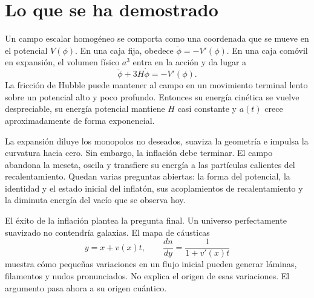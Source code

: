 \section{Lo que se ha demostrado}

Un campo escalar homogéneo se comporta como una coordenada que se mueve en el potencial \(V(\phi)\). En una caja fija, obedece \(\ddot\phi=-V'(\phi)\). En una caja comóvil en expansión, el volumen físico \(a^3\) entra en la acción y da lugar a
\[
\ddot\phi+3H\dot\phi=-V'(\phi).
\]
La fricción de Hubble puede mantener al campo en un movimiento terminal lento sobre un potencial alto y poco profundo. Entonces su energía cinética se vuelve despreciable, su energía potencial mantiene \(H\) casi constante y \(a(t)\) crece aproximadamente de forma exponencial.

La expansión diluye los monopolos no deseados, suaviza la geometría e impulsa la curvatura hacia cero. Sin embargo, la inflación debe terminar. El campo abandona la meseta, oscila y transfiere su energía a las partículas calientes del recalentamiento. Quedan varias preguntas abiertas: la forma del potencial, la identidad y el estado inicial del inflatón, sus acoplamientos de recalentamiento y la diminuta energía del vacío que se observa hoy.

El éxito de la inflación plantea la pregunta final. Un universo perfectamente suavizado no contendría galaxias. El mapa de cáusticas
\[
y=x+v(x)t,
\qquad
\frac{dn}{dy}=\frac{1}{1+v'(x)t}
\]
muestra cómo pequeñas variaciones en un flujo inicial pueden generar láminas, filamentos y nudos pronunciados. No explica el origen de esas variaciones. El argumento pasa ahora a su origen cuántico.